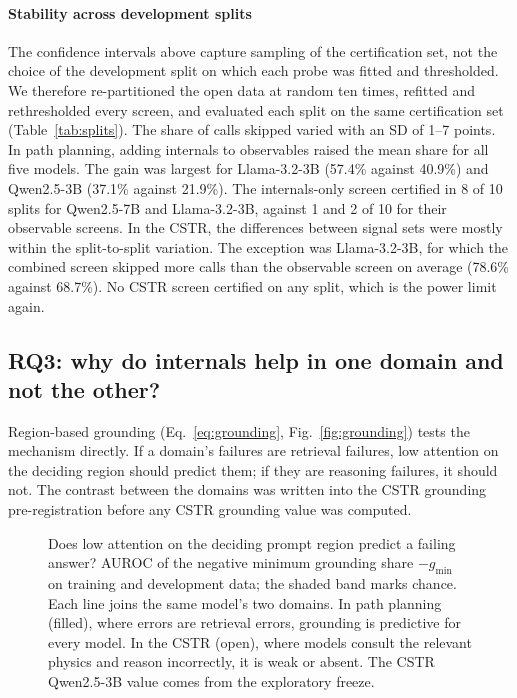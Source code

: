 \paragraph{Stability across development splits} The confidence intervals above capture sampling of the
certification set, not the choice of the development split on which each probe was fitted and thresholded. We
therefore re-partitioned the open data at random ten times, refitted and rethresholded every screen, and evaluated
each split on the same certification set (Table~\ref{tab:splits}). The share of calls skipped varied with an SD of
1--7 points. In path planning, adding internals to observables raised the mean share for all five models. The gain
was largest for Llama-3.2-3B (57.4\% against 40.9\%) and Qwen2.5-3B (37.1\% against 21.9\%). The internals-only screen
certified in 8 of 10 splits for Qwen2.5-7B and Llama-3.2-3B, against 1 and 2 of 10 for their observable screens. In
the CSTR, the differences between signal sets were mostly within the split-to-split variation. The exception was
Llama-3.2-3B, for which the combined screen skipped more calls than the observable screen on average (78.6\% against
68.7\%). No CSTR screen certified on any split, which is the power limit again.

\subsection{RQ3: why do internals help in one domain and not the other?}\label{sec:res-rq3}


Region-based grounding (Eq.~\ref{eq:grounding}, Fig.~\ref{fig:grounding}) tests the mechanism directly. If a
domain's failures are retrieval failures, low attention on the deciding region should predict them; if they are
reasoning failures, it should not. The contrast between the domains was written into the CSTR grounding
pre-registration before any CSTR grounding value was computed.

\begin{figure}[!htbp]
\centering

\caption{Does low attention on the deciding prompt region predict a failing answer? AUROC of the negative minimum
grounding share $-g_{\min}$ on training and development data; the shaded band marks chance. Each line joins the
same model's two domains. In path planning (filled), where errors are retrieval errors, grounding is predictive for
every model. In the CSTR (open), where models consult the relevant physics and reason incorrectly, it is weak or
absent. The CSTR Qwen2.5-3B value comes from the exploratory freeze.}
\label{fig:mechanism}
\end{figure}

